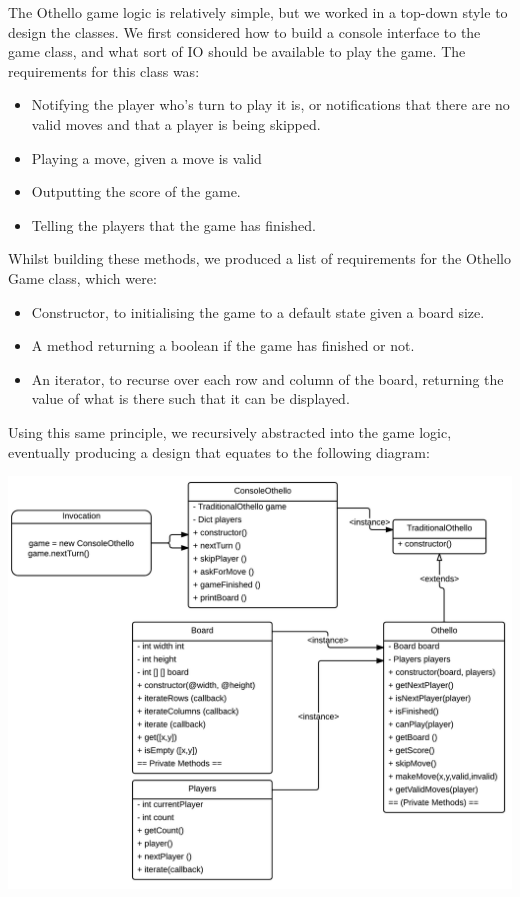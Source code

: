 \documentclass[a4wide, 11pt]{article}
\begin{document}
The Othello game logic is relatively simple, but we worked in a top-down style to design the classes. We first considered how to build a console interface to the game class, and what sort of IO should be available to play the game. The requirements for this class was:
\begin{itemize}
\item Notifying the player who's turn to play it is, or notifications that there are no valid moves and that a player is being skipped.
\item Playing a move, given a move is valid
\item Outputting the score of the game.
\item Telling the players that the game has finished.
\end{itemize}
Whilst building these methods, we produced a list of requirements for the Othello Game class, which were:
\begin{itemize}
\item Constructor, to initialising the game to a default state given a board size.
\item A method returning a boolean if the game has finished or not.
\item An iterator, to recurse over each row and column of the board, returning the value of what is there such that it can be displayed.
\end{itemize}
Using this same principle, we recursively abstracted into the game logic, eventually producing a design that equates to the following diagram:

\includegraphics[width=\textwidth]{OthelloGameClassDiagram.png}
\end{document}
